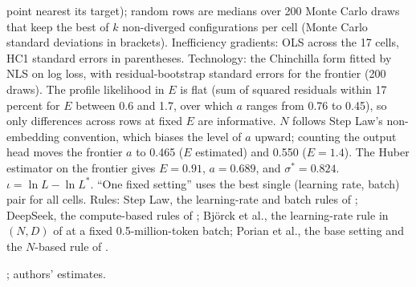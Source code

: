 \begin{table}[tp]
\begin{tablenotes}
point nearest its target); random rows are medians over 200 Monte Carlo draws that keep the best of $k$ non-diverged
configurations per cell (Monte Carlo standard deviations in brackets). Inefficiency gradients: OLS across the 17 cells,
HC1 standard errors in parentheses. Technology: the Chinchilla form fitted by NLS on log loss, with residual-bootstrap
standard errors for the frontier (200 draws). The profile likelihood in $E$ is flat (sum of squared residuals within
17 percent for $E$ between 0.6 and 1.7, over which $a$ ranges from 0.76 to 0.45), so only differences across rows at
fixed $E$ are informative. $N$ follows Step Law's non-embedding convention, which biases the level of $a$ upward; counting
the output head moves the frontier $a$ to 0.465 ($E$ estimated) and 0.550 ($E=1.4$). The Huber estimator on the frontier
gives $E=0.91$, $a=0.689$, and $\sigma^*=0.824$. $\iota=\ln L-\ln L^*$. ``One fixed setting'' uses the best single (learning rate, batch) pair for all cells. Rules: Step Law, the learning-rate and batch rules of
\citet{li2025predictablea}; DeepSeek, the compute-based rules of \citet{bi2024deepseek}; Bj\"orck et al., the learning-rate rule
in $(N,D)$ of \citet{bjorck2024scaling} at a fixed 0.5-million-token batch; Porian et al., the base setting and the
$N$-based rule of \citet{porian2024resolving}.\end{tablenotes}
\begin{tablenotes}[Source]\citet{li2025predictablea}; authors' estimates.\end{tablenotes}
\end{table}
